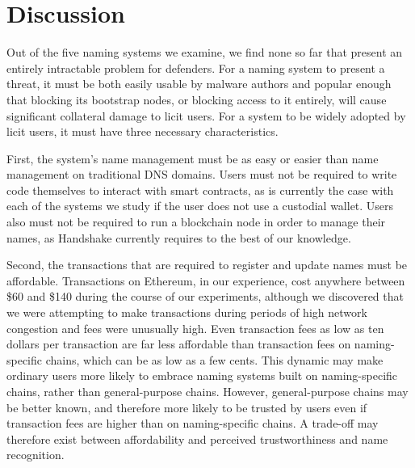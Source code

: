 \section{Discussion}
\label{sec:discussion}

Out of the five naming systems we examine, we find none so far that present an 
entirely intractable problem for defenders. For a naming system to present a  
threat, it must be both easily usable by malware authors and 
popular enough that blocking its bootstrap nodes, or blocking 
access to it entirely, will cause significant collateral damage to licit users.
For a system to be widely adopted by licit users, it must have three necessary 
characteristics. 

First, the system's name management must be as 
easy or easier than name management on traditional DNS domains. Users must not 
be required to write 
code themselves to interact with smart contracts, as is currently the case with 
each of the systems we 
study if the user does not use a custodial wallet. Users also 
must not be required to run a blockchain node in order to 
manage their names, as 
Handshake currently requires to the best of our knowledge.

Second, the transactions that are required to register and update names must be 
affordable. 
Transactions on Ethereum, in our experience, cost anywhere between \$60 and 
\$140 during the course of 
our experiments, although we discovered that we were attempting to make 
transactions during periods of 
high network congestion and fees were unusually high. Even transaction fees as 
low as ten dollars per 
transaction are far less affordable than transaction fees on naming-specific 
chains, which can be as 
low as a few cents. This dynamic may make ordinary users more likely to embrace 
naming systems built 
on naming-specific chains, rather than general-purpose chains. However, 
general-purpose chains may be 
better known, and therefore more likely to be trusted by users even if 
transaction fees are higher 
than on naming-specific chains. A trade-off may therefore exist between 
affordability and perceived 
trustworthiness and name recognition.  

